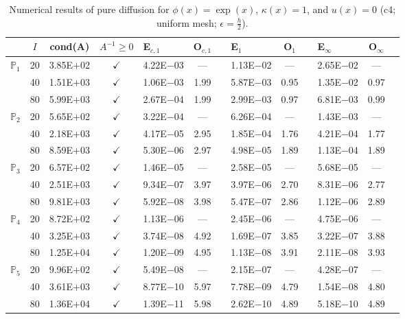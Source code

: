 \begin{table}[H]
\centering
\caption{Numerical results of pure diffusion for $\phi(x)=\exp(x)$, $\kappa(x)=1$, and $u(x)=0$ (c4; uniform mesh; $\epsilon=\frac{h}{2}$).}
\begin{tabular}{@{}l c c c l c c l c c l c c@{}}
\toprule
 & $I$ & cond(A) & $A^{-1}\geq 0$ &  E$_{c,1}$ & O$_{c,1}$ && E$_1$ & O$_1$ && E$_{\infty}$ & O$_{\infty}$\\
\midrule
\multirow{3}{*}{$\mathbb{P}_{1}$}
 & 20 & 3.85E$+$02 & $\checkmark$ & 4.22E$-$03 & --- && 1.13E$-$02 & --- && 2.65E$-$02 & ---\\
 & 40 & 1.51E$+$03 & $\checkmark$ & 1.06E$-$03 & 1.99 && 5.87E$-$03 & 0.95 && 1.35E$-$02 & 0.97\\
 & 80 & 5.99E$+$03 & $\checkmark$ & 2.67E$-$04 & 1.99 && 2.99E$-$03 & 0.97 && 6.81E$-$03 & 0.99\\
\midrule
\multirow{3}{*}{$\mathbb{P}_{2}$}
 & 20 & 5.65E$+$02 & $\checkmark$ & 3.22E$-$04 & --- && 6.26E$-$04 & --- && 1.43E$-$03 & ---\\
 & 40 & 2.18E$+$03 & $\checkmark$ & 4.17E$-$05 & 2.95 && 1.85E$-$04 & 1.76 && 4.21E$-$04 & 1.77\\
 & 80 & 8.59E$+$03 & $\checkmark$ & 5.30E$-$06 & 2.97 && 4.98E$-$05 & 1.89 && 1.13E$-$04 & 1.89\\
\midrule
\multirow{3}{*}{$\mathbb{P}_{3}$}
 & 20 & 6.57E$+$02 & $\checkmark$ & 1.46E$-$05 & --- && 2.58E$-$05 & --- && 5.68E$-$05 & ---\\
 & 40 & 2.51E$+$03 & $\checkmark$ & 9.34E$-$07 & 3.97 && 3.97E$-$06 & 2.70 && 8.31E$-$06 & 2.77\\
 & 80 & 9.81E$+$03 & $\checkmark$ & 5.92E$-$08 & 3.98 && 5.47E$-$07 & 2.86 && 1.12E$-$06 & 2.89\\
\midrule
\multirow{3}{*}{$\mathbb{P}_{4}$}
 & 20 & 8.72E$+$02 & $\checkmark$ & 1.13E$-$06 & --- && 2.45E$-$06 & --- && 4.75E$-$06 & ---\\
 & 40 & 3.25E$+$03 & $\checkmark$ & 3.74E$-$08 & 4.92 && 1.69E$-$07 & 3.85 && 3.22E$-$07 & 3.88\\
 & 80 & 1.25E$+$04 & $\checkmark$ & 1.20E$-$09 & 4.95 && 1.13E$-$08 & 3.91 && 2.11E$-$08 & 3.93\\
\midrule
\multirow{3}{*}{$\mathbb{P}_{5}$}
 & 20 & 9.96E$+$02 & $\checkmark$ & 5.49E$-$08 & --- && 2.15E$-$07 & --- && 4.28E$-$07 & ---\\
 & 40 & 3.61E$+$03 & $\checkmark$ & 8.77E$-$10 & 5.97 && 7.78E$-$09 & 4.79 && 1.54E$-$08 & 4.80\\
 & 80 & 1.36E$+$04 & $\checkmark$ & 1.39E$-$11 & 5.98 && 2.62E$-$10 & 4.89 && 5.18E$-$10 & 4.89\\
\bottomrule
\end{tabular}
\end{table}